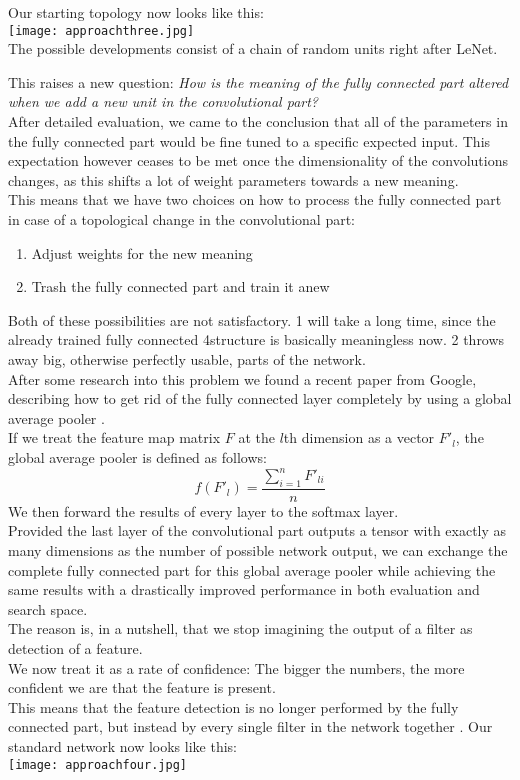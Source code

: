 Our starting topology now looks like this:\\
\texttt{[image: approachthree.jpg]}\\
The possible developments consist of a chain of random units right after LeNet.

This raises a new question: \emph{How is the meaning of the fully connected part altered when we add a new unit in the convolutional part?}\\
After detailed evaluation, we came to the conclusion that all of the parameters in the fully connected part would be fine tuned to a specific expected input. This expectation however ceases to be met once the dimensionality of the convolutions changes, as this shifts a lot of weight parameters towards a new meaning.\\
This means that we have two choices on how to process the fully connected part in case of a topological change in the convolutional part:
\begin{enumerate}
	\item{Adjust weights for the new meaning}
	\item{Trash the fully connected part and train it anew}
\end{enumerate}  
Both of these possibilities are not satisfactory. 1 will take a long time, since the already trained fully connected 4structure is basically meaningless now. 2 throws away big, otherwise perfectly usable, parts of the network.\\
After some research into this problem we found a recent paper from Google, describing how to get rid of the fully connected layer completely by using a global average pooler \cite{Lin2014}.\\
If we treat the feature map matrix \(F\) at the \(l\)th dimension as a vector \(F'_l\), the global average pooler is defined as follows:
\[ f(F'_l) = \frac{\sum_{i = 1}^{n} F'_{li}}{n} \]
We then forward the results of every layer to the softmax layer.\\
Provided the last layer of the convolutional part outputs a tensor with exactly as many dimensions as the number of possible network output, we can exchange the complete fully connected part for this global average pooler while achieving the same results with a drastically improved performance in both evaluation and search space. \cite{Lin2014}\\
The reason is, in a nutshell, that we stop imagining the output of a filter as detection of a feature.\\
We now treat it as a rate of confidence: The bigger the numbers, the more confident we are that the feature is present.\\
This means that the feature detection is no longer performed by the fully connected part, but instead by every single filter in the network together \cite{Lin2014}.
Our standard network now looks like this:\\
\texttt{[image: approachfour.jpg]}\\

